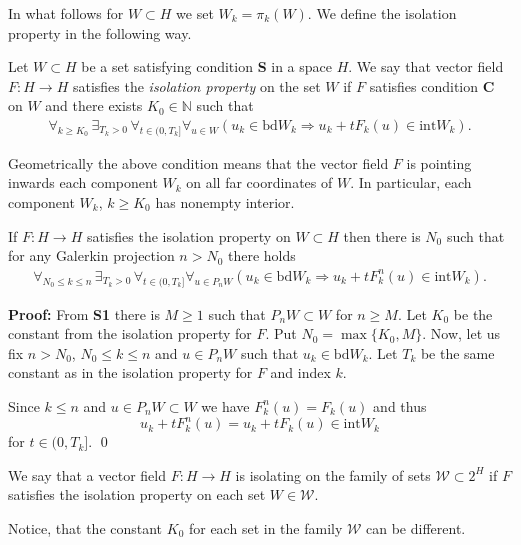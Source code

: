 In what follows for  $W \subset H$ we set $W_k=\pi_k (W)$. We define the isolation property in the following way.
\begin{definition}
	Let $W\subset H$ be a set satisfying condition {\bf S} in a \gss space $H$. We say that  vector field $F:H\to H$ satisfies the \emph{isolation property} on the set $W$ if $F$ satisfies condition \textbf{C} on $W$ and there exists $K_0\in\mathbb N$ such that
	\begin{eqnarray*}
		\forall_{k\geq K_0}\, \exists_{T_k>0}\, \forall_{t\in(0,T_k]}\forall_{u\in W}
		\left(  u_k\in\mathrm{bd} W_k\Longrightarrow u_k + tF_k(u) \in\mathrm{int}W_k\right).
	\end{eqnarray*}	
\end{definition}
Geometrically the above condition means that the vector field $F$ is pointing inwards each component $W_k$ on all far coordinates of $W$. In particular, each component $W_k$, $k\geq K_0$ has nonempty interior.
\begin{lemma}\label{lem:isolation-for-projections}
	If $F:H\to H$ satisfies  the isolation property on $W\subset H$ then there is $N_0$ such that for any Galerkin projection $n>N_0$ there holds
	\begin{eqnarray*}
	\forall_{N_0\leq k\leq n}\, \exists_{T_k>0}\, \forall_{t\in(0,T_k]}\forall_{u\in P_nW}
	\left(  u_k\in\mathrm{bd} W_k\Longrightarrow u_k + tF_k^n(u) \in\mathrm{int}W_k\right).
\end{eqnarray*}	
\end{lemma}
\textbf{Proof:}
From \textbf{S1} there is $M\geq 1$ such that $P_nW\subset W$ for $n\geq M$. Let $K_0$ be the constant from  the isolation property for $F$. Put $N_0=\max\{K_0,M\}$. Now, let us fix $n>N_0$, $N_0\leq k\leq n$ and $u\in P_nW$ such that $u_k\in\mathrm{bd}W_k$. Let $T_k$ be the same constant as in the isolation property for $F$ and index $k$.

Since $k\leq n$ and $u\in P_nW\subset W$ we have $F^n_k(u) =F_k(u)$ and thus
\begin{equation*}
	u_k+tF_k^n(u) = u_k+tF_k(u)\in \mathrm{int}W_k
\end{equation*}
for $t\in(0,T_k]$.
\qed

\begin{definition}
	We say that a vector field $F:H\to H$ is isolating on the family of sets $\mathcal W\subset 2^H$ if $F$ satisfies the isolation property on each set $W\in\mathcal W$.
\end{definition}
Notice, that the constant $K_0$ for each set in the family $\mathcal W$ can be different.

